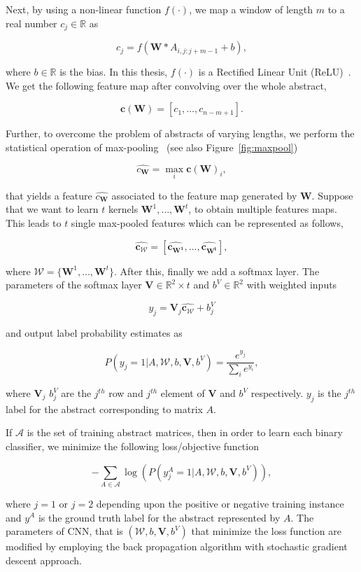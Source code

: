 Next, by using a non-linear function $f(\cdot)$, we map a window of length $m$ to a real number $c_j \in \mathbb{R}$ as 

\[c_j = f(\mathbf{W} * A_{i, j:j+m-1} + b),
\]
 
 where $b \in \mathbb{R}$ is the bias. In this thesis, $f(\cdot)$ is a Rectified Linear Unit (ReLU)~\cite{glorot2011deep, nair2010rectified}. We get the following feature map after convolving over the whole abstract,

 \[\mathbf{c(W)} = [c_1, \ldots, c_{n-m+1}].\]

 Further, to overcome the problem of abstracts of varying lengths, we perform the statistical operation of max-pooling~\cite{zhou1988image} (see also Figure~\ref{fig:maxpool})

 \[\widehat{c_{\mathbf{W}}} = \max_{i} \mathbf{c(W)}_i,\]

 that yields a feature $\widehat{c_{\mathbf{W}}}$ associated to the feature map generated by $\mathbf{W}$. Suppose that we want to learn $t$ kernels $\mathbf{W}^1, \ldots, \mathbf{W}^t$, to obtain multiple features maps. This leads to $t$ single max-pooled features which can be represented as follows,

 \[ \mathbf{\widehat{c_{\mathcal{W}}}} = [\mathbf{\widehat{c_{\mathbf{W}^1}}}, \ldots, \mathbf{\widehat{c_{\mathbf{W}^t}}}],
 \]

 where $\mathcal{W} = \{\mathbf{W}^1, \ldots, \mathbf{W}^t\}$. After this, finally we add a softmax layer. The parameters of the softmax layer $\mathbf{V} \in \mathbb{R}^2 \times t$ and $b^{V} \in \mathbb{R}^2$ with weighted inputs 

 \[y_j = \mathbf{V}_j \mathbf{\widehat{c_{\mathcal{W}}}} + b^{V}_j\]

and output label probability estimates as

\[P(y_j = 1 | A, \mathcal{W}, b, \mathbf{V}, b^{V}) = \frac{e^{y_j}}{\sum_i e^{y_i}},\]

where $\mathbf{V}_j$ $b^{V}_j$ are the $j^{th}$ row and $j^{th}$ element of $\mathbf{V}$ and $b^{V}$ respectively. $y_j$ is the $j^{th}$ label for the abstract corresponding to matrix $A$. 

If $\mathcal{A}$ is the set of training abstract matrices, then in order to learn each binary classifier, we minimize the following loss/objective function

\[- \sum_{A \in \mathcal{A}} \log(P(y_j^A = 1 | A, \mathcal{W}, b, \mathbf{V}, b^{V})),\]

where $j=1$ or $j=2$ depending upon the positive or negative training instance and $y^A$ is the ground truth label for the abstract represented by $A$. The parameters of CNN, that is $(\mathcal{W}, b, \mathbf{V}, b^{V})$ that minimize the loss function are modified by employing the back propagation algorithm with stochastic gradient descent approach. 

